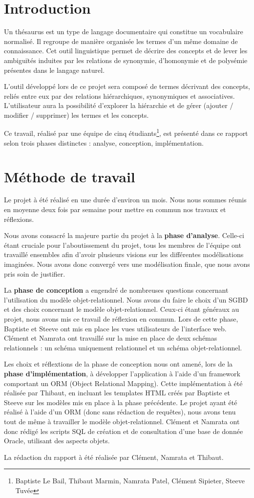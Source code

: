 \chapter*{Introduction}
Un thésaurus est un type de langage documentaire qui constitue un vocabulaire normalisé. Il regroupe de manière organisée les termes d'un même domaine de connaissance. Cet outil linguistique permet de décrire des concepts et de lever les ambiguïtés induites par les relations de synonymie, d'homonymie et de polysémie présentes dans le langage naturel.

L'outil développé lors de ce projet sera composé de termes décrivant des concepts, reliés entre eux par des relations hiérarchiques, synonymiques et associatives. L'utilisateur aura la possibilité d'explorer la hiérarchie et de gérer (ajouter / modifier / supprimer) les termes et les concepts.

Ce travail, réalisé par une équipe de cinq étudiants\footnote{Baptiste Le Bail, Thibaut Marmin, Namrata Patel, Clément Sipieter, Steeve Tuvée}, est présenté dans ce rapport selon trois phases distinctes : analyse, conception, implémentation.
\clearemptydoublepage
\chapter*{Méthode de travail}

Le projet à été réalisé en une durée d'environ un mois. Nous nous sommes réunis en moyenne deux fois par semaine pour mettre en commun nos travaux et réflexions.

Nous avons consacré la majeure partie du projet à la \textbf{phase d'analyse}. Celle-ci étant cruciale pour l'aboutissement du projet, tous les membres de l'équipe ont travaillé ensembles afin d'avoir plusieurs visions sur les différentes modélisations imaginées. Nous avons donc convergé vers une modélisation finale, que nous avons pris soin de justifier.

La \textbf{phase de conception} a engendré de nombreuses questions concernant l'utilisation du modèle objet-relationnel. Nous avons du faire le choix d'un SGBD et des choix concernant le modèle objet-relationnel. Ceux-ci étant généraux au projet, nous avons mis ce travail de réflexion en commun. Lors de cette phase, Baptiste et Steeve ont mis en place les vues utilisateurs de l'interface web. Clément et Namrata ont travaillé sur la mise en place de deux schémas relationnels : un schéma uniquement relationnel et un schéma objet-relationnel.

Les choix et réflextions de la phase de conception nous ont amené, lors de la \textbf{phase d'implémentation}, à développer l'application à l'aide d'un framework comportant un ORM (Object Relational Mapping). Cette implémentation à été réalisée par Thibaut, en incluant les templates HTML créés par Baptiste et Steeve sur les modèles mis en place à la phase précédente. Le projet ayant été réalisé à l'aide d'un ORM (donc sans rédaction de requêtes), nous avons tenu tout de même à travailler le modèle objet-relationnel. Clément et Namrata ont donc rédigé les scripts SQL de création et de consultation d'une base de donnée Oracle, utilisant des aspects objets.

La rédaction du rapport à été réalisée par Clément, Namrata et Thibaut.